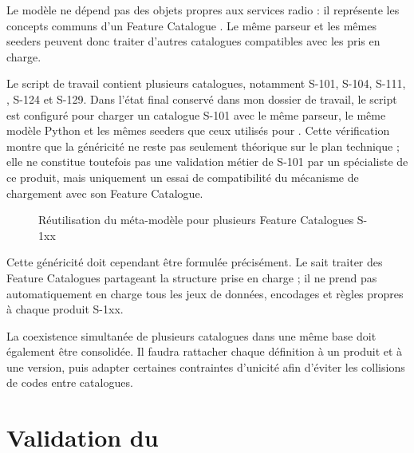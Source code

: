 Le modèle ne dépend pas des objets propres aux services radio : il représente les concepts communs d'un Feature Catalogue . Le même parseur et les mêmes seeders peuvent donc traiter d'autres catalogues compatibles avec les  pris en charge.

Le script de travail contient plusieurs catalogues, notamment S-101, S-104, S-111, , S-124 et S-129. Dans l'état final conservé dans mon dossier de travail, le script est configuré pour charger un catalogue S-101 avec le même parseur, le même modèle Python et les mêmes seeders que ceux utilisés pour . Cette vérification montre que la généricité ne reste pas seulement théorique sur le plan technique ; elle ne constitue toutefois pas une validation métier de S-101 par un spécialiste de ce produit, mais uniquement un essai de compatibilité du mécanisme de chargement avec son Feature Catalogue.

\begin{figure}[H]
\centering
{}
\caption{Réutilisation du méta-modèle pour plusieurs Feature Catalogues S-1xx}
\label{fig:coexistence-s1xx}
\end{figure}

Cette généricité doit cependant être formulée précisément. Le  sait traiter des Feature Catalogues partageant la structure  prise en charge ; il ne prend pas automatiquement en charge tous les jeux de données, encodages et règles propres à chaque produit S-1xx.

La coexistence simultanée de plusieurs catalogues dans une même base doit également être consolidée. Il faudra rattacher chaque définition à un produit et à une version, puis adapter certaines contraintes d'unicité afin d'éviter les collisions de codes entre catalogues.

\section{Validation du }

